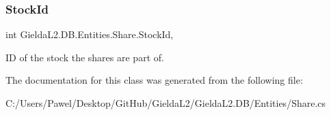\subsubsection{\texorpdfstring{StockId}{StockId}}
{\footnotesize\ttfamily int Gielda\+L2.\+D\+B.\+Entities.\+Share.\+Stock\+Id\hspace{0.3cm}{\ttfamily [get]}, {\ttfamily [set]}}



ID of the stock the shares are part of. 



The documentation for this class was generated from the following file\+:\begin{DoxyCompactItemize}
\item 
C\+:/\+Users/\+Pawel/\+Desktop/\+Git\+Hub/\+Gielda\+L2/\+Gielda\+L2.\+D\+B/\+Entities/Share.\+cs\end{DoxyCompactItemize}

